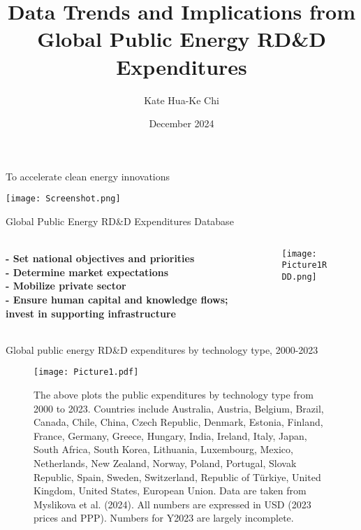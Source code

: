 \documentclass{beamer}
\date{}
\title[]{Data Trends and Implications from Global Public Energy RD\&D Expenditures}
\author[Myslikova et al. 2024]{Kate Hua-Ke Chi \inst{1}}
\institute[] 
{
  \inst{1}
  The Fletcher School of Tufts University\\
  Climate Policy Lab
}
\date{December 2024}
\begin{document}
 

\begin{frame}	
\titlepage	
\end{frame}		

\begin{frame}{To accelerate clean energy innovations}	

\begin{center}
    \texttt{[image: Screenshot.png]}
\end{center}

\end{frame}

\begin{frame}{Global Public Energy RD\&D Expenditures Database}	

\begin{columns}	
\begin{column}{0.3\textwidth} 
\begin{text}
\paragraph{\small
- Set national objectives and priorities\\
- Determine market expectations\\
- Mobilize private sector\\
- Ensure human capital and knowledge flows; invest in supporting infrastructure\\}
\end{text}
\end{column}

\begin{column}{0.6\textwidth}
\begin{figure}
\texttt{[image: Picture1RDD.png]}
\end{figure}
\end{column}
\end{columns}
\end{frame}

\begin{frame}
Global public energy RD\&D expenditures by technology type, 2000-2023

\begin{figure}
    \centering
    \texttt{[image: Picture1.pdf]}
    \caption{\label{} 
    \fontsize{6}{8} 
    \selectfont 
    The above plots the public expenditures by technology type from 2000 to 2023. Countries include Australia, Austria, Belgium, Brazil, Canada, Chile, China, Czech Republic, Denmark, Estonia, Finland, France, Germany, Greece, Hungary, India, Ireland, Italy, Japan, South Africa, South Korea, Lithuania, Luxembourg, Mexico, Netherlands, New Zealand, Norway, Poland, Portugal, Slovak Republic, Spain, Sweden, Switzerland, Republic of Türkiye, United Kingdom, United States, European Union. Data are taken from Myslikova et al. (2024). All numbers are expressed in USD (2023 prices and PPP). Numbers for Y2023 are largely incomplete.
}
\end{figure}
\end{frame}
\end{document}
